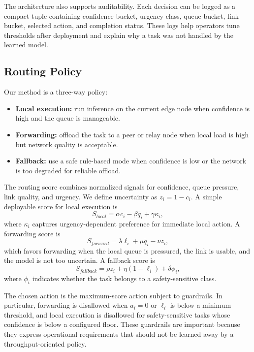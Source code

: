 \documentclass[10pt, conference]{IEEEtran}
\begin{document}
The architecture also supports auditability. Each decision can be logged as a compact tuple containing confidence bucket, urgency class, queue bucket, link bucket, selected action, and completion status. These logs help operators tune thresholds after deployment and explain why a task was not handled by the learned model.

\subsection{Routing Policy}
Our method is a three-way policy:
\begin{itemize}
    \item \textbf{Local execution:} run inference on the current edge node when confidence is high and the queue is manageable.
    \item \textbf{Forwarding:} offload the task to a peer or relay node when local load is high but network quality is acceptable.
    \item \textbf{Fallback:} use a safe rule-based mode when confidence is low or the network is too degraded for reliable offload.
\end{itemize}

The routing score combines normalized signals for confidence, queue pressure, link quality, and urgency. We define uncertainty as $z_i=1-c_i$. A simple deployable score for local execution is
\begin{equation}
    S_{local}=\alpha c_i - \beta \bar{q}_i + \gamma \kappa_i,
\end{equation}
where $\kappa_i$ captures urgency-dependent preference for immediate local action. A forwarding score is
\begin{equation}
    S_{forward}=\lambda \ell_i + \mu \bar{q}_i - \nu z_i,
\end{equation}
which favors forwarding when the local queue is pressured, the link is usable, and the model is not too uncertain. A fallback score is
\begin{equation}
    S_{fallback}=\rho z_i + \eta (1-\ell_i) + \delta \phi_i,
\end{equation}
where $\phi_i$ indicates whether the task belongs to a safety-sensitive class.

The chosen action is the maximum-score action subject to guardrails. In particular, forwarding is disallowed when $a_i=0$ or $\ell_i$ is below a minimum threshold, and local execution is disallowed for safety-sensitive tasks whose confidence is below a configured floor. These guardrails are important because they express operational requirements that should not be learned away by a throughput-oriented policy.
\end{document}
